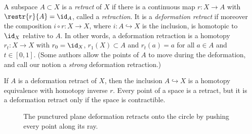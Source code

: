 \begin{defn}
    A subspace $A\subset X$ is a \emph{retract} of $X$ if there is a continuous map $r:X\to A$ with $\restr{r}{A}=\id_A$, called a \emph{retraction}. It is a \emph{deformation retract} if moreover the composition $i\circ r:X\to X$, where $i:A\hookrightarrow X$ is the inclusion, is homotopic to $\id_X$ relative to $A$. In other words, a deformation retraction is a homotopy $r_t:X\to X$ with $r_0=\id_X$, $r_1(X)\subset A$ and $r_t(a)=a$ for all $a\in A$ and $t\in[0,1]$. (Some authors allow the points of $A$ to move during the deformation, and call our notion a \emph{strong} deformation retraction.)
\end{defn}

If $A$ is a deformation retract of $X$, then the inclusion $A\hookrightarrow X$ is a homotopy equivalence with homotopy inverse $r$. Every point of a space is a retract, but it is a deformation retract only if the space is contractible.

\begin{figure}[tp]
    \centering
    \caption{The punctured plane deformation retracts onto the circle by pushing every point along its ray.}
    \label{fig radial retraction}
\end{figure}

